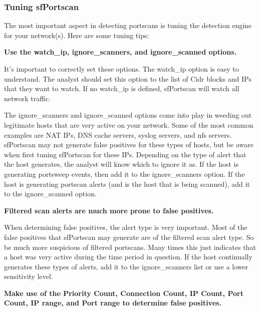 \documentclass[english]{report}
\newcounter{slistnum}
\newenvironment{slist}
{ \begin{list}{ {\bf \arabic{slistnum}.} }{\usecounter{slistnum} } }
{ \end{list} }
\begin{document}
\subsubsection{Tuning sfPortscan\label{tuning sfportscan}}

The most important aspect in detecting portscans is tuning the detection engine
for your network(s).  Here are some tuning tips:

\begin{slist}

\item \textbf{Use the watch\_ip, ignore\_scanners, and ignore\_scanned options.}
  
     It's important to correctly set these options.  The watch\_ip option is easy
     to understand.  The analyst should set this option to the list of Cidr 
     blocks and IPs that they want to watch.  If no watch\_ip is defined, 
     sfPortscan will watch all network traffic.
     
     The ignore\_scanners and ignore\_scanned options come into play in weeding
     out legitimate hosts that are very active on your network.  Some of the
     most common examples are NAT IPs, DNS cache servers, syslog servers, and
     nfs servers.  sfPortscan may not generate false positives for these types
     of hosts, but be aware when first tuning sfPortscan for these IPs. 
     Depending on the type of alert that the host generates, the analyst will
     know which to ignore it as.  If the host is generating portsweep events,
     then add it to the ignore\_scanners option.  If the host is generating
     portscan alerts (and is the host that is being scanned), add it to the
     ignore\_scanned option.
  
\item \textbf{Filtered scan alerts are much more prone to false positives.}
  
     When determining false positives, the alert type is very important.  Most of
     the false positives that sfPortscan may generate are of the filtered scan
     alert type.  So be much more suspicious of filtered portscans.  Many times
     this just indicates that a host was very active during the time period in
     question.  If the host continually generates these types of alerts, add it
     to the ignore\_scanners list or use a lower sensitivity level.
     
\item \textbf{Make use of the Priority Count, Connection Count, IP Count, Port Count, IP
     range, and Port range to determine false positives.}
     

\end{slist}
\end{document}

